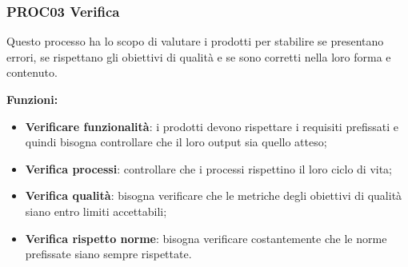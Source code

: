 \documentclass[../piano_di_qualifica.tex]{subfiles}
\begin{document}
%
%

\subsubsection{PROC03 Verifica}
Questo processo ha lo scopo di valutare i prodotti per stabilire se presentano errori, se rispettano gli obiettivi di qualità e se sono corretti nella loro forma e contenuto.

\textbf{Funzioni:}
\smallbreak
\begin{itemize}
	\item \textbf{Verificare funzionalità}:  i prodotti devono rispettare i requisiti prefissati e quindi bisogna controllare che il loro output sia quello atteso;
	\item \textbf{Verifica processi}:  controllare che i processi rispettino il loro ciclo di vita;
	\item \textbf{Verifica qualità}:  bisogna verificare che le metriche degli obiettivi di qualità siano entro limiti accettabili;
	\item \textbf{Verifica rispetto norme}: bisogna verificare costantemente che le norme prefissate siano sempre rispettate.
\end{itemize}
\end{document}
